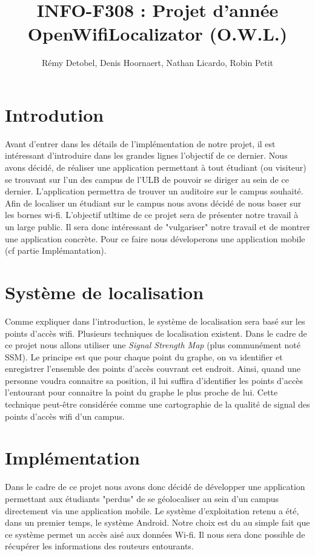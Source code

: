 \documentclass[a4paper,11pt]{article}
\title{INFO-F308 : Projet d'année \\ OpenWifiLocalizator (O.W.L.)}
\author{Rémy Detobel, Denis Hoornaert, Nathan Licardo, Robin Petit}
\begin{document}
\maketitle

\section{Introdution}
	Avant d'entrer dans les détails de l'implémentation de notre projet, il est intéressant d'introduire dans les grandes lignes l'objectif de ce dernier.
	Nous avons décidé, de réaliser une application permettant à tout étudiant (ou visiteur) se trouvant sur l'un des campus de l'ULB de pouvoir se diriger au sein de ce dernier.
	L'application permettra de trouver un auditoire sur le campus souhaité. Afin de localiser un étudiant sur le campus nous avons décidé de nous baser sur les bornes wi-fi.
	L'objectif utltime de ce projet sera de présenter notre travail à un large public.
	Il sera donc intéressant de "vulgariser" notre travail et de montrer une application concrète.
	Pour ce faire nous déveloperons une application mobile (cf partie Implémantation).

\section{Système de localisation}
	Comme expliquer dans l'introduction, le système de localisation sera basé sur les points d'accès wifi. Plusieurs techniques de localisation existent.
	Dans le cadre de ce projet nous allons utiliser une \textit{Signal Strength Map} (plus communément noté SSM).
	Le principe est que pour chaque point du graphe, on va identifier et enregistrer l'ensemble des points d'accès couvrant cet endroit.
	Ainsi, quand une personne voudra connaitre sa position, il lui suffira d'identifier les points d'accès l'entourant pour connaitre la point du graphe le plus proche de lui.
	Cette technique peut-être considérée comme une cartographie de la qualité de signal des points d'accès wifi d'un campus.

\section{Implémentation}
	Dans le cadre de ce projet nous avons donc décidé de développer une application permettant aux étudiants "perdus" de se géolocaliser au sein d'un campus directement
	via une application mobile. Le système d'exploitation retenu a été, dans un premier temps, le système Android. Notre choix est du au simple fait que ce système permet un
	accès aisé aux données Wi-fi. Il nous sera donc possible de récupérer les informations des routeurs entourants.
\end{document}
